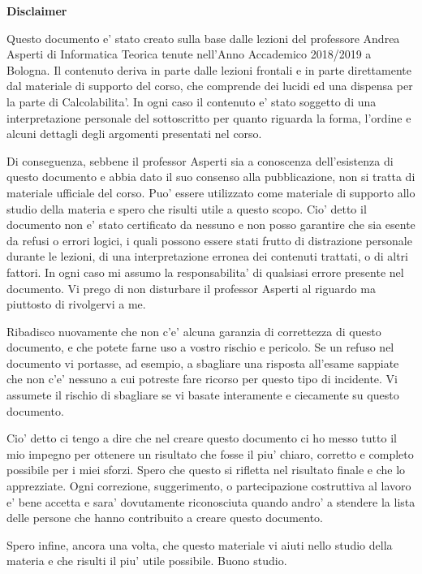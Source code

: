 \thispagestyle{plain}
\begin{center}
    \Large
    \textbf{Disclaimer}
\end{center}

Questo documento e' stato creato sulla base dalle lezioni del professore Andrea Asperti di
Informatica Teorica tenute nell'Anno Accademico 2018/2019 a Bologna. Il contenuto deriva in parte
dalle lezioni frontali e in parte direttamente dal materiale di supporto del corso, che comprende
dei lucidi ed una dispensa per la parte di Calcolabilita'. In ogni caso il contenuto e' stato
soggetto di una interpretazione personale del sottoscritto per quanto riguarda la forma, l'ordine e
alcuni dettagli degli argomenti presentati nel corso.

Di conseguenza, sebbene il professor Asperti sia a conoscenza dell'esistenza di questo documento e
abbia dato il suo consenso alla pubblicazione, non si tratta di materiale ufficiale del corso. Puo'
essere utilizzato come materiale di supporto allo studio della materia e spero che risulti utile a
questo scopo. Cio' detto il documento non e' stato certificato da nessuno e non posso garantire che
sia esente da refusi o errori logici, i quali possono essere stati frutto di distrazione personale
durante le lezioni, di una interpretazione erronea dei contenuti trattati, o di altri fattori. In
ogni caso mi assumo la responsabilita' di qualsiasi errore presente nel documento. Vi prego di non
disturbare il professor Asperti al riguardo ma piuttosto di rivolgervi a me.

Ribadisco nuovamente che non c'e' alcuna garanzia di correttezza di questo documento, e che potete
farne uso a vostro rischio e pericolo. Se un refuso nel documento vi portasse, ad esempio, a
sbagliare una risposta all'esame sappiate che non c'e' nessuno a cui potreste fare ricorso per
questo tipo di incidente. Vi assumete il rischio di sbagliare se vi basate interamente e ciecamente
su questo documento.

Cio' detto ci tengo a dire che nel creare questo documento ci ho messo tutto il mio impegno per
ottenere un risultato che fosse il piu' chiaro, corretto e completo possibile per i miei sforzi.
Spero che questo si rifletta nel risultato finale e che lo apprezziate. Ogni correzione,
suggerimento, o partecipazione costruttiva al lavoro e' bene accetta e sara' dovutamente
riconosciuta quando andro' a stendere la lista delle persone che hanno contribuito a creare questo
documento.

Spero infine, ancora una volta, che questo materiale vi aiuti nello studio della materia e che
risulti il piu' utile possibile. Buono studio.
